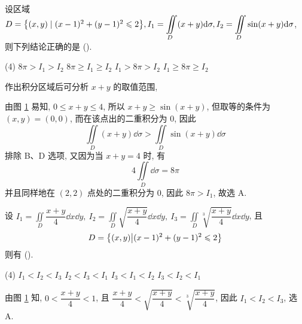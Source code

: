 \begin{example}
    设区域 $D=\qty{(x,y)\mid (x-1)^2+(y-1)^2\leqslant 2},I_1=\displaystyle\iint\limits_D (x+y)\dd \sigma,I_2=\iint\limits_D\sin(x+y)\dd \sigma$, 则下列结论正确的是 (\quad).
    \begin{tasks}(4)
        \task $8\pi>I_1>I_2$
        \task $8\pi\geqslant I_1\geqslant I_2$
        \task $I_1>8\pi>I_2$
        \task $I_1\geqslant 8\pi\geqslant I_2$
    \end{tasks}
\end{example}
\begin{solution}
    作出积分区域后可分析 $x+y$ 的取值范围, \\
    \begin{minipage}{0.29\linewidth}
        \begin{figure}[H]
            \centering
            \caption{}
            \label{tikz_ercjf}
        \end{figure}
    \end{minipage}\hfill
    \begin{minipage}{0.7\linewidth}
        由图 \ref{tikz_ercjf} 易知, $0\leqslant x+y\leqslant 4$, 所以 $x+y\geqslant \sin(x+y)$, 但取等的条件为 $(x,y)=(0,0)$, 而在该点出的二重积分为 0, 因此
        $$\displaystyle\iint\limits_D(x+y)\dd \sigma>\iint\limits_D\sin(x+y)\dd \sigma$$
        排除 B、D 选项, 又因为当 $x+y=4$ 时, 有
        $$4\iint\limits_D\dd \sigma=8\pi$$ 并且同样地在 $(2,2)$ 点处的二重积分为 $0$, 因此 $8\pi>I_1$, 故选 A.
    \end{minipage}
\end{solution}

\begin{example}
    设 $\displaystyle I_1=\iint\limits_D\dfrac{x+y}{4}\dd x\dd y,~I_2=\iint\limits_D\sqrt{\dfrac{x+y}{4}}\dd x\dd y,~I_3=\iint\limits_D\sqrt[3]{\dfrac{x+y}{4}}\dd x\dd y$,
    且 $$D=\qty{(x,y)\big| (x-1)^2+(y-1)^2\leqslant 2}$$
    则有 (\quad).
    \begin{tasks}(4)
        \task $I_1<I_2<I_3$
        \task $I_2<I_3<I_1$
        \task $I_3<I_1<I_2$
        \task $I_3<I_2<I_1$
    \end{tasks}
\end{example}
\begin{solution}
    由图 \ref{tikz_ercjf} 知, $0<\dfrac{x+y}{4}<1$, 且 $\dfrac{x+y}{4}<\sqrt{\dfrac{x+y}{4}}<\sqrt[3]{\dfrac{x+y}{4}}$, 因此 $I_1<I_2<I_3$, 选 A.
\end{solution}

